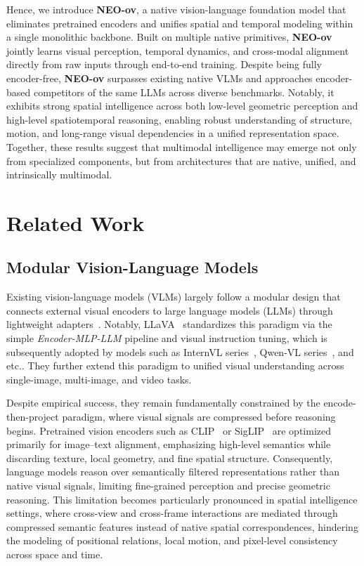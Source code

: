 \documentclass{llmxive}
\providecommand{\etc}{etc.\xspace}
\begin{document}
Hence, we introduce \textbf{NEO-ov}, a native vision-language foundation model that eliminates pretrained encoders and unifies spatial and temporal modeling within a single monolithic backbone. 
%
Built on multiple native primitives, \textbf{NEO-ov} jointly learns visual perception, temporal dynamics, and cross-modal alignment directly from raw inputs through end-to-end training.
%
Despite being fully encoder-free, \textbf{NEO-ov} surpasses existing native VLMs and approaches encoder-based competitors of the same LLMs across diverse benchmarks. 
%
Notably, it exhibits strong spatial intelligence across both low-level geometric perception and high-level spatiotemporal reasoning, enabling robust understanding of structure, motion, and long-range visual dependencies in a unified representation space.
%
Together, these results suggest that multimodal intelligence may emerge not only from specialized components, but from architectures that are native, unified, and intrinsically multimodal.





\section{Related Work}
\subsection{Modular Vision-Language Models}
Existing vision-language models (VLMs) largely follow a modular design that connects external visual encoders to large language models (LLMs) through lightweight adapters~\cite{VLP:Flamingo,VLM:InstructBLIP}. Notably, LLaVA~\cite{VLM:LLaVA,VLM:LLaVA-NeXT} standardizes this paradigm via the simple \textit{Encoder-MLP-LLM} pipeline and visual instruction tuning, which is subsequently adopted by models such as InternVL series~\cite{VLM:InternVL-2.5,VLM:InternVL-3,VLM:InternVL-3.5}, Qwen-VL series~\cite{VLM:Qwen2-VL,VLM:Qwen2.5-VL,VLM:Qwen3VL}, and \etc. 
They further extend this paradigm to unified visual understanding across single-image, multi-image, and video tasks.


Despite empirical success, they remain fundamentally constrained by the encode-then-project paradigm, where visual signals are compressed before reasoning begins. Pretrained vision encoders such as CLIP~\cite{VLP:CLIP} or SigLIP~\cite{VLP:SigLIP,VLP:SigLIP-2} are optimized primarily for image–text alignment, emphasizing high-level semantics while discarding texture, local geometry, and fine spatial structure. Consequently, language models reason over semantically filtered representations rather than native visual signals, limiting fine-grained perception and precise geometric reasoning. This limitation becomes particularly pronounced in spatial intelligence settings, where cross-view and cross-frame interactions are mediated through compressed semantic features instead of native spatial correspondences, hindering the modeling of positional relations, local motion, and pixel-level consistency across space and time.
\end{document}
